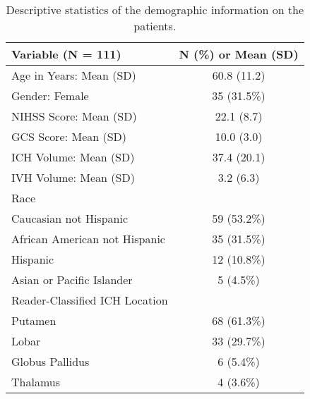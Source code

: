 \begin{table}[ht]
\centering
\begin{tabular}{lc}
  \hline {\bf Variable (N = 111)} & {\bf N (\%) or Mean (SD)} \\ 
  \hline
Age in Years: Mean (SD) & 60.8 (11.2) \\ 
   \hline
Gender: Female & 35 (31.5\%) \\ 
   \hline
NIHSS Score: Mean (SD) & 22.1 (8.7) \\ 
   \hline
GCS Score: Mean (SD) & 10.0 (3.0) \\ 
   \hline
ICH Volume: Mean (SD) & 37.4 (20.1) \\ 
   \hline
IVH Volume: Mean (SD) & 3.2 (6.3) \\ 
   \hline
Race &  \\ 
   \hline
\text{  } Caucasian not Hispanic & 59 (53.2\%) \\ 
   \hline
\text{  } African American not Hispanic & 35 (31.5\%) \\ 
   \hline
\text{  } Hispanic & 12 (10.8\%) \\ 
   \hline
\text{  } Asian or Pacific Islander & 5 (4.5\%) \\ 
   \hline
Reader-Classified ICH Location &  \\ 
   \hline
\text{  } Putamen & 68 (61.3\%) \\ 
   \hline
\text{  } Lobar & 33 (29.7\%) \\ 
   \hline
\text{  } Globus Pallidus & 6 (5.4\%) \\ 
   \hline
\text{  } Thalamus & 4 (3.6\%) \\ 
   \hline
\end{tabular}
\caption{Descriptive statistics of the demographic information on the patients.} 
\label{t:dem}
\end{table}
